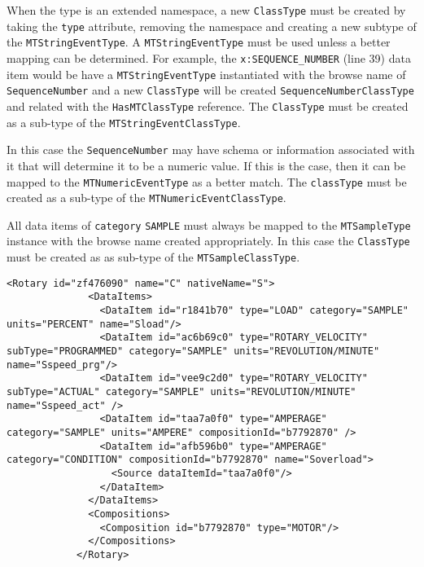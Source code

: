 When the type is an extended namespace, a new \texttt{ClassType} must be created by taking the \texttt{type} attribute, removing the namespace and creating a new subtype of the \texttt{MTString\-EventType}. A \texttt{MTString\-EventType} must be used unless a better mapping can be determined. For example, the \texttt{x:SEQUENCE_NUMBER} (line 39) data item would be have a \texttt{MTString\-EventType} instantiated with the browse name of \texttt{SequenceNumber} and a new \texttt{ClassType} will be created \texttt{Sequence\-NumberClassType} and related with the \texttt{HasMT\-ClassType} reference. The \texttt{ClassType} must be created as a sub-type of the \texttt{MTStringEventClassType}.

In this case the \texttt{SequenceNumber} may have schema or information associated with it that will determine it to be a numeric value. If this is the case, then it can be mapped to the \texttt{MTNumericEventType} as a better match. The \texttt{classType} must be created as a sub-type of the \texttt{MTNumericEventClassType}.

All data items of \texttt{category} \texttt{SAMPLE} must always be mapped to the \texttt{MTSampleType} instance with the browse name created appropriately. In this case the \texttt{ClassType} must be created as as sub-type of the \texttt{MTSampleClassType}.

\begin{lstlisting}[firstnumber=last,%
    caption={Rotary C Axis},label={lst:rotary-axis-example-1}]
            <Rotary id="zf476090" name="C" nativeName="S">
              <DataItems>
                <DataItem id="r1841b70" type="LOAD" category="SAMPLE" units="PERCENT" name="Sload"/>
                <DataItem id="ac6b69c0" type="ROTARY_VELOCITY" subType="PROGRAMMED" category="SAMPLE" units="REVOLUTION/MINUTE" name="Sspeed_prg"/>
                <DataItem id="vee9c2d0" type="ROTARY_VELOCITY" subType="ACTUAL" category="SAMPLE" units="REVOLUTION/MINUTE" name="Sspeed_act" />
                <DataItem id="taa7a0f0" type="AMPERAGE" category="SAMPLE" units="AMPERE" compositionId="b7792870" />
                <DataItem id="afb596b0" type="AMPERAGE" category="CONDITION" compositionId="b7792870" name="Soverload">
                  <Source dataItemId="taa7a0f0"/>
                </DataItem>
              </DataItems>
              <Compositions>
                <Composition id="b7792870" type="MOTOR"/>
              </Compositions>
            </Rotary>
\end{lstlisting}

